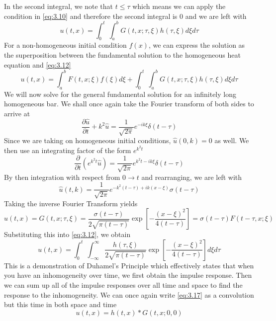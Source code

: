 \documentclass{article}
\newcommand{\pd}[2]{\frac{\partial #1}{\partial #2}}
\newcommand{\pull}{\! \! \!}
\newcommand{\gfsh}{G(t,x;\tau,\xi)}
\numberwithin{equation}{section}
\begin{document}
In the second integral, we note that $t \leq \tau$ which means we can apply the condition in \eqref{eq:3.10} and therefore the second integral is 0 and we are left with 
\begin{equation}
    u(t,x) =\int^t_0\pull\, \int^b_a \gfsh h(\tau,\xi)d\xi d\tau \label{eq:3.12}
\end{equation}
For a non-homogeneous initial condition $f(x)$, we can express the solution as the superposition between the fundamental solution to the homogeneous heat equation and \eqref{eq:3.12} 
\begin{equation}
    u(t,x) = \int^b_a F(t,x;\xi)f(\xi) d\xi + \int^t_0\pull\, \int^b_a \gfsh h(\tau,\xi)d\xi d\tau 
\end{equation} 
We will now solve for the general fundamental solution for an infinitely long homogeneous bar. We shall once again take the Fourier transform of both sides to arrive at 
\begin{equation}
    \pd{\hat{u}}{t} +k^2\hat{u} = \frac{1}{\sqrt{2 \pi}}e^{-ik\xi} \delta (t-\tau)
\end{equation}
Since we are taking on homogeneous initial conditions, $\hat{u}(0,k) = 0$ as well. We then use an integrating factor of the form $e^{k^2t}$
\begin{equation*}
    \pd{}{t}\left( e^{k^2t}\hat{u}\right) = \frac{1}{\sqrt{2\pi}}e^{k^2t-ik\xi} \delta(t-\tau)
\end{equation*}
By then integration with respect from $0\rightarrow t$ and rearranging, we are left with 
\begin{equation}
    \hat{u}(t,k)=\frac{1}{\sqrt{2\pi}}e^{-k^2(t-\tau)+ik(x-\xi)}\sigma(t-\tau)
\end{equation}
Taking the inverse Fourier Transform yields
\begin{equation}
    u(t,x)=\gfsh =\frac{\sigma (t-\tau)}{2\sqrt{\pi (t-\tau)}}\exp\left[{\displaystyle{-\frac{(x-\xi)^2}{4(t-\tau)}}}\right] = \sigma(t-\tau)F(t-\tau,x;\xi) 
\end{equation}
Substituting this into \eqref{eq:3.12}, we obtain
\begin{equation}
    u(t,x)=\int^t_0 \pull\,\int_{-\infty}^\infty \frac{h (\tau,\xi)}{2\sqrt{\pi(t-\tau)}}\exp \left[ -\frac{(x-\xi)^2}{4(t-\tau)} \right]d\xi d\tau \label{eq:3.17}
\end{equation}
This is a demonstration of Duhamel's Principle which effectively states that when you have an inhomogeneity over time, we first obtain the impulse response. Then we can sum up all of the impulse responses over all time and space to find the response to the inhomogeneity. We can once again write \eqref{eq:3.17} as a convolution but this time in both space and time
\begin{equation}
    u(t,x) = h(t,x) * G(t,x;0,0)
\end{equation}
\end{document}
